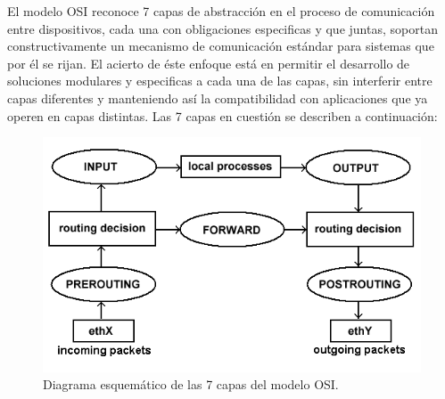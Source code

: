 El modelo OSI reconoce 7 capas de abstracción en el proceso de comunicación entre dispositivos, cada una con obligaciones especificas y que juntas, soportan constructivamente un mecanismo de comunicación estándar para sistemas que por él se rijan. El acierto de éste enfoque está en permitir el desarrollo de soluciones modulares y especificas a cada una de las capas, sin interferir entre capas diferentes y manteniendo así la compatibilidad con aplicaciones que ya operen en capas distintas. Las 7 capas en cuestión se describen a continuación:

\begin{figure}[!h]
	\centering
	\includegraphics[scale=.3]{imagenes/netfilterArchitecture}
	\caption{Diagrama esquemático de las 7 capas del modelo OSI.}
	\label{netfilterArchitecture}
\end{figure}

